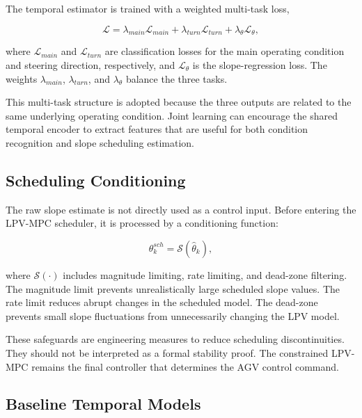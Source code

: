 \documentclass{ieeeaccess}
\begin{document}
The temporal estimator is trained with a weighted multi-task loss,

\begin{equation}
\mathcal{L}
=
\lambda_{main}\mathcal{L}_{main}
+
\lambda_{turn}\mathcal{L}_{turn}
+
\lambda_{\theta}\mathcal{L}_{\theta},
\label{eq:multi_task_loss}
\end{equation}

where $\mathcal{L}_{main}$ and $\mathcal{L}_{turn}$ are classification losses for the main operating condition and steering direction, respectively, and $\mathcal{L}_{\theta}$ is the slope-regression loss. The weights $\lambda_{main}$, $\lambda_{turn}$, and $\lambda_{\theta}$ balance the three tasks.



This multi-task structure is adopted because the three outputs are related to the same underlying operating condition. Joint learning can encourage the shared temporal encoder to extract features that are useful for both condition recognition and slope scheduling estimation.



\subsection{Scheduling Conditioning}



The raw slope estimate is not directly used as a control input. Before entering the LPV-MPC scheduler, it is processed by a conditioning function:

\begin{equation}
\theta^{sch}_k = \mathcal{S}(\hat{\theta}_k),
\label{eq:scheduling_conditioning}
\end{equation}

where $\mathcal{S}(\cdot)$ includes magnitude limiting, rate limiting, and dead-zone filtering. The magnitude limit prevents unrealistically large scheduled slope values. The rate limit reduces abrupt changes in the scheduled model. The dead-zone prevents small slope fluctuations from unnecessarily changing the LPV model.



These safeguards are engineering measures to reduce scheduling discontinuities. They should not be interpreted as a formal stability proof. The constrained LPV-MPC remains the final controller that determines the AGV control command.



\subsection{Baseline Temporal Models}
\end{document}
